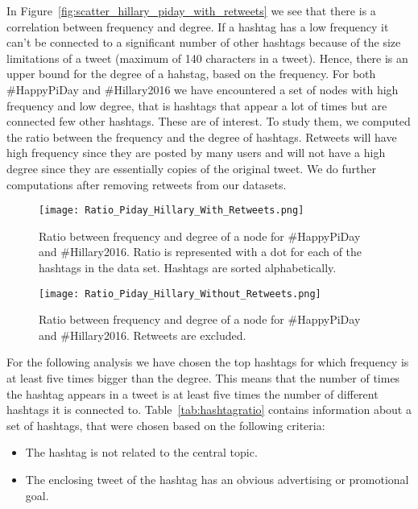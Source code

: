 \documentclass[journal, a4paper, 12pt]{article}
\begin{document}
In Figure~\ref{fig:scatter_hillary_piday_with_retweets} we see that there is a correlation between frequency and degree. If a hashtag has a low frequency it can't be connected to a significant number of other hashtags because of the size limitations of a tweet (maximum of 140 characters in a tweet). Hence, there is an upper bound for the degree of a hahstag, based on the frequency. For both \#HappyPiDay and \#Hillary2016 we have encountered a set of nodes with high frequency and low degree, that is hashtags that appear a lot of times but are connected few other hashtags. These are of interest. To study them, we computed the ratio between the frequency and the degree of hashtags. %
Retweets will have high frequency since they are posted by many users and will not have a high degree since they are essentially copies of the original tweet. We do further computations after removing retweets from our datasets. \\


    
        \begin{figure}[!hbt]
		\begin{center}
		\texttt{[image: Ratio\_Piday\_Hillary\_With\_Retweets.png]}
		\caption{Ratio between frequency and degree of a node for \#HappyPiDay and \#Hillary2016. Ratio is represented with a dot for each of the hashtags in the data set. Hashtags are sorted alphabetically.}
		\label{fig:ratio_hillary_piday_with_retweets}
		\end{center}
	\end{figure}
    

        \begin{figure}[!hbt]
		\begin{center}
		\texttt{[image: Ratio\_Piday\_Hillary\_Without\_Retweets.png]}
		\caption{Ratio between frequency and degree of a node for \#HappyPiDay and \#Hillary2016. Retweets are excluded.}
		\label{fig:ratio_hillary_piday_without_retweets}
		\end{center}
	\end{figure}
    
    
For the following analysis we have chosen the top hashtags for which frequency is at least five times bigger than the degree. This means that the number of times the hashtag  appears in a tweet is at least five times the number of different hashtags it is connected to. Table~\ref{tab:hashtagratio} contains information about a set of hashtags, that were chosen based on the following criteria:
\begin{itemize}
\item The hashtag is not related to the central topic.
\item The enclosing tweet of the hashtag has an obvious advertising or promotional goal.
\end{itemize}
\end{document}
